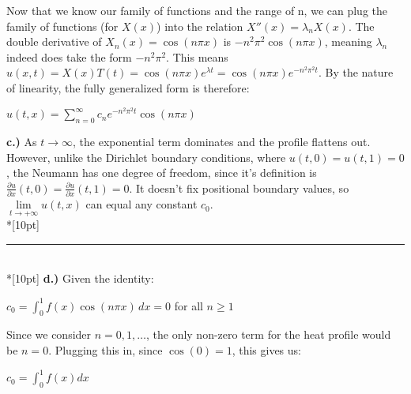 \documentclass{article}
\begin{document}
Now that we know our family of functions and the range of n, we can plug the family of functions (for \(X(x)\)) into the relation \(X''(x) = \lambda_n X(x)\). The double derivative of \(X_n(x) = \cos(n\pi x)\) is \(-n^2\pi^2\cos(n\pi x)\), meaning \(\lambda_n\) indeed does take the form \(-n^2\pi^2\). This means \(u(x, t) = X(x)T(t) = \cos(n\pi x)e^{\lambda t} = \cos(n\pi x)e^{-n^2\pi^2 t}\). By the nature of linearity, the fully generalized form is therefore:
\begin{center}
    \(\displaystyle u(t, x) = \sum_{n=0}^{\infty} c_ne^{-n^2\pi^2t}\cos(n\pi x)\)
\end{center}
\clearpage \noindent
\textbf{c.)} As \(t \rightarrow \infty\), the exponential term dominates and the profile flattens out. However, unlike the Dirichlet boundary conditions, where \(u(t, 0) = u(t, 1) = 0\), the Neumann has one degree of freedom, since it's definition is \(\displaystyle \frac{\partial u}{\partial x}(t, 0) = \frac{\partial u}{\partial x}(t, 1) = 0\). It doesn't fix positional boundary values, so \(\lim\limits_{t \to +\infty} u(t, x)\) can equal any constant \(c_0\).\\*[10pt]
\rule{\linewidth}{0.2mm}\\*[10pt]
\textbf{d.)} Given the identity: 
\begin{center}
    \(\displaystyle c_0 = \int_{0}^{1} f(x)\cos(n\pi x) \, dx = 0\) for all \(n \geq 1\)
\end{center}
Since we consider \(n = 0, 1, \ldots\), the only non-zero term for the heat profile would be \(n = 0\). Plugging this in, since \(\cos(0) = 1\), this gives us:
\begin{center}
    \(\displaystyle c_0 = \int_{0}^{1} f(x)dx\)
\end{center}
\clearpage \noindent
\end{document}
